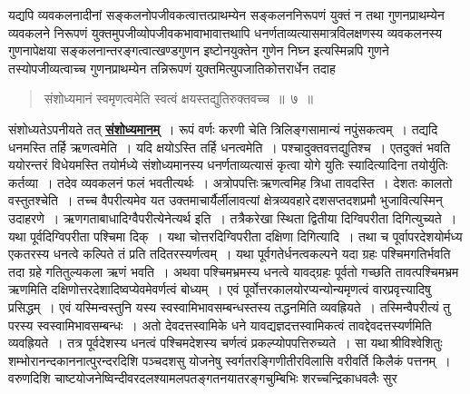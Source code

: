 \documentclass[11pt, openany]{book}
\begin{document}
यद्यपि व्यवकलनादीनां सङ्कलनोपजीवकत्वात्तत्प्राथम्येन सङ्कलननिरूपणं
युक्तं न तथा गुणनप्राथम्येन व्यवकलने निरूपणं
युक्तमुपजीव्योपजीवकभावाभावात्तथापि
धनर्णताव्यत्यासमात्रविलक्षणस्य व्यवकलनस्य गुणनापेक्षया
सङ्कलनान्तरङ्गत्वात्खण्डगुणन इष्टोनयुक्तेन गुणेन निघ्न इत्यस्मिन्नपि गुणने
तस्योपजीव्यत्वाच्च गुणनप्राथम्येन तन्निरूपणं युक्तमित्युपजातिकोत्तरार्धेन तदाह\textendash 

 \label{7}
\begin{quote}
    \ab
     संशोध्यमानं स्वमृणत्वमेति स्वत्वं क्षयस्तद्युतिरुक्तवच्च~॥~७~॥
\end{quote}

संशोध्यतेऽपनीयते तत् \hyperref[7]{\textbf{संशोध्यमानम्}}~। रूपं वर्णः करणी चेति
त्रिलिङ्गसामान्यं नपुंसकत्वम्~। तद्यदि धनमस्ति तर्हि ऋणत्वमेति~। यदि क्षयोऽस्ति तर्हि
धनत्वमेति~। पश्चादुक्तवत्तद्युतिश्च~। एतदुक्तं भवति\textendash \,ययोरन्तरं
विधेयमस्ति तयोर्मध्ये संशोध्यमानस्य धनर्णताव्यत्यासं कृत्वा योगे युतिः
स्यादित्यादिना तयोर्युतिः कर्तव्या~। तदेव व्यवकलनं फलं भवतीत्यर्थः~। अत्रोपपत्तिः\textendash \,ऋणत्वमिह त्रिधा तावदस्ति~। देशतः कालतो वस्तुतश्चेति~। तच्च वैपरीत्यमेव
यत उक्तमाचार्यैर्लीलावत्यां क्षेत्रव्यवहारे\textendash \,दशसप्तदशप्रमौ
भुजावित्यस्मिन् उदाहरणे~। ऋणगताबाधादिग्वैपरीत्येनेत्यर्थ इति~। तत्रैकरेखा स्थिता द्वितीया
दिग्विपरीता दिगित्युच्यते~। यथा पूर्वदिग्विपरीता पश्चिमा दिक्~। यथा
चोत्तरदिग्विपरीता दक्षिणा दिगित्यादि~। तथा च पूर्वापरदेशयोर्मध्य एकतरस्य धनत्वे कल्पिते
तं प्रति तदितरस्यर्णत्वम्~। यथा पूर्वगतेर्धनत्वकल्पने यदा ग्रहः
पश्चिमगतिर्भवति तदा ग्रहे गतितुल्यकला ऋणं भवति~। अथवा पश्चिमभ्रमस्य धनत्वे
यावद्ग्रहः पूर्वतो गच्छति तावत्पश्चिमभ्रम ऋणमिति दक्षिणोत्तरदेशादिष्वप्येवमेवर्णत्वं बोध्यम्~। एवं पूर्वोत्तरकालयोरप्यन्योन्यमृणत्वं वारप्रवृत्त्यादिषु प्रसिद्धम्~।
एवं यस्मिन्वस्तुनि यस्य स्वस्वामिभावसम्बन्धस्तस्य
तद्धनमिति व्यवह्रियते~। तस्मिन्वैपरीत्यं तु परस्य स्वस्वामिभावसम्बन्धः~।
अतो देवदत्तस्वामिके धने यावद्यज्ञदत्तस्वामिकत्वं तावद्देवदत्तस्यर्णमिति
व्यवह्रियते~। तत्र पूर्वदेशस्य धनत्वं पश्चिमदेशस्य चर्णत्वं प्रकल्प्योपपत्तिरुच्यते~।
सा यथा\textendash \,श्रीविश्वेशितुः शम्भोरानन्दकाननात्पुरन्दरदिशि पञ्चदशसु योजनेषु
स्वर्गतरङ्गिणीतीरविलासि वरीवर्ति किलैकं पत्तनम्~। वरुणदिशि
चाष्टयोजनेष्विन्दीवरदलश्यामलपतङ्गतनयातरङ्गचुम्बिभिः शरच्चन्द्रिकाधवलैः
सुर\textendash\ 

\newpage %
\end{document}

